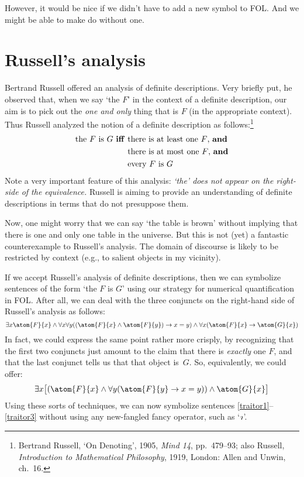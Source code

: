 However, it would be nice if we didn't have to add a new symbol to FOL. And we might be able to make do without one.

\section{Russell's analysis}
Bertrand Russell offered an analysis of definite descriptions. Very briefly put, he observed that, when we say `the $F$' in the context of a definite description, our aim is to pick out the \emph{one and only} thing that is $F$ (in the appropriate context). Thus Russell analyzed the notion of a definite description as follows:\footnote{Bertrand Russell, `On Denoting', 1905, \emph{Mind 14}, pp.\ 479--93; also Russell, \emph{Introduction to Mathematical Philosophy}, 1919, London: Allen and Unwin, ch.\ 16.}
	\begin{align*}
		\text{the $F$ is $G$ \textbf{iff} }&\text{there is at least one $F$, \emph{and}}\\
	&\text{there is at most one $F$, \emph{and}}\\	
	&\text{every $F$ is $G$}
\end{align*}
Note a very important feature of this analysis: \emph{`the' does not appear on the right-side of the equivalence.} Russell is aiming to provide an understanding of definite descriptions in terms that do not presuppose them.

Now, one might worry that we can say `the table is brown' without implying that there is one and only one table in the universe. But this is not (yet) a fantastic counterexample to Russell's analysis. The domain of discourse is likely to be restricted by context (e.g., to salient objects in my vicinity).

If we accept Russell's analysis of definite descriptions, then we can symbolize sentences of the form `the $F$ is $G$' using our strategy for numerical quantification in FOL. After all, we can deal with the three conjuncts on the right-hand side of Russell's analysis as follows:
	$$\exists x \atom{F}{x} \eand \forall x \forall y ((\atom{F}{x} \eand \atom{F}{y}) \eif x = y) \eand \forall x (\atom{F}{x} \eif \atom{G}{x})$$
In fact, we could express the same point rather more crisply, by recognizing that the first two conjuncts just amount to the claim that there is \emph{exactly} one $F$, and that the last conjunct tells us that that object is~$G$. So, equivalently, we could offer:
	$$\exists x \bigl[(\atom{F}{x} \eand \forall y (\atom{F}{y} \eif x = y)) \eand \atom{G}{x}\bigr]$$
Using these sorts of techniques, we can now symbolize sentences \ref{traitor1}--\ref{traitor3} without using any new-fangled fancy operator, such as `$\maththe$'.

